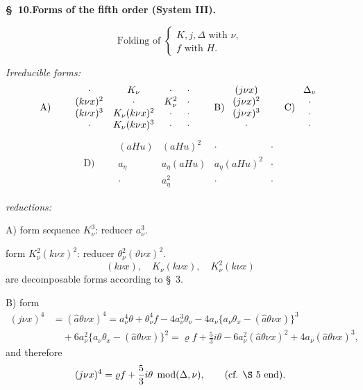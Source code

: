 \documentclass[11pt]{article}
\newcommand{\A}{\Delta}
\newcommand{\R}{\varrho}
\newcommand{\hata}{\widehat{a}}
\newcommand{\modu}[1]{\;\operatorname{mod} #1}
\begin{document}
\begin{center}
\textbf{\S\ 10.\quad Forms of the fifth order (System III).}
\end{center}

\[
\text{Folding of }\left\{\begin{array}{l}
K,j,\A \text{ with }\nu,\\
f\text{ with }H.
\end{array}\right.
\]

\noindent\emph{Irreducible forms:}
\[
\begin{array}{c@{\qquad}c@{\qquad}c@{\qquad}c}
\text{A)} & \begin{array}{cccc}
\cdot&K_\nu&\cdot&\cdot\\
(k\nu x)^2&\cdot&K_\nu^2&\cdot\\
(k\nu x)^3&K_\nu(k\nu x)^2&\cdot&\cdot\\
\cdot&K_\nu(k\nu x)^3&\cdot&\cdot
\end{array}
&
\text{B)}\ \begin{array}{c}(j\nu x)\\(j\nu x)^2\\(j\nu x)^3\\ \cdot\end{array}
&
\text{C)}\ \begin{array}{c}\A_\nu\\\cdot\\\cdot\\\cdot\end{array}
\end{array}
\]
\[
\text{D)}\qquad
\begin{array}{cccc}
(aHu)&(aHu)^2&\cdot&\cdot\\
a_\eta&a_\eta(aHu)&a_\eta(aHu)^2&\cdot\\
\cdot&a_\eta^2&\cdot&\cdot
\end{array}
\]

\noindent\emph{reductions:}

\noindent A) form sequence $K_\nu^3$: reducer $a_\nu^3$.

form $K_\nu^2(k\nu x)^2$: reducer $\theta_\nu^2(\vartheta\nu x)^2$.
\[
(k\nu x),\quad K_\nu(k\nu x),\quad K_\nu^2(k\nu x)
\]
are decomposable forms according to \S\ 3.

\noindent B) form
\[
\begin{aligned}
(j\nu x)^4&=(\hata\theta\nu x)^4
=a_\nu^4\theta+\theta_\nu^4 f-4a_\nu^3\theta_\nu
-4a_\nu\{a_\nu\theta_x-(\hata\theta\nu x)\}^3\\
&\quad+6a_\nu^2\{a_\nu\theta_x-(\hata\theta\nu x)\}^2
=\R f+\frac53 i\theta-6a_\nu^2(\hata\theta\nu x)^2
+4a_\nu(\hata\theta\nu x)^3,
\end{aligned}
\]
and therefore
\[
(j\nu x)^4=\R f+\frac53 i\theta\modu{(\A,\nu)},\qquad (\text{cf. \S\ 5 end}).
\]
\end{document}
